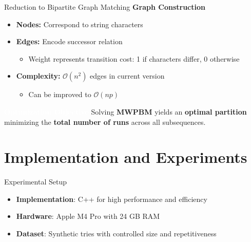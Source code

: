 \documentclass[aspectratio=169]{beamer}
\begin{document}
\begin{frame}{Reduction to Bipartite Graph Matching}
	\textcolor{oiRed}{\textbf{Graph Construction}}
	\begin{itemize}
		\item \textbf{Nodes:} Correspond to string characters
		\item \textbf{Edges:} Encode successor relation
		      \begin{itemize}
			      \item Weight represents transition cost: 1 if characters differ, 0 otherwise
		      \end{itemize}
		\item \textbf{Complexity:} $\mathcal{O}(n^2)$ edges in current version
		      \begin{itemize}
			      \item Can be improved to $\mathcal{O}(np)$
		      \end{itemize}
	\end{itemize}

	\vspace{0.2cm}
	\begin{block}{\textcolor{white}{\textbf{Optimization Objective}}}
		Solving \textbf{MWPBM} yields an \textcolor{oiBlue}{\textbf{optimal partition}} minimizing the \textcolor{oiBlue}{\textbf{total number of runs}} across all subsequences.
	\end{block}
\end{frame}


\section{Implementation and Experiments}
\begin{frame}{Experimental Setup}
	\begin{itemize}
		\item \textcolor{oiBlue}{\textbf{Implementation}:} C++ for high performance and efficiency
		\item \textcolor{oiGreen}{\textbf{Hardware}:} Apple M4 Pro with 24 GB RAM
		\item \textcolor{oiRed}{\textbf{Dataset}:} Synthetic tries with controlled size and repetitiveness
	\end{itemize}
\end{frame}
\end{document}
